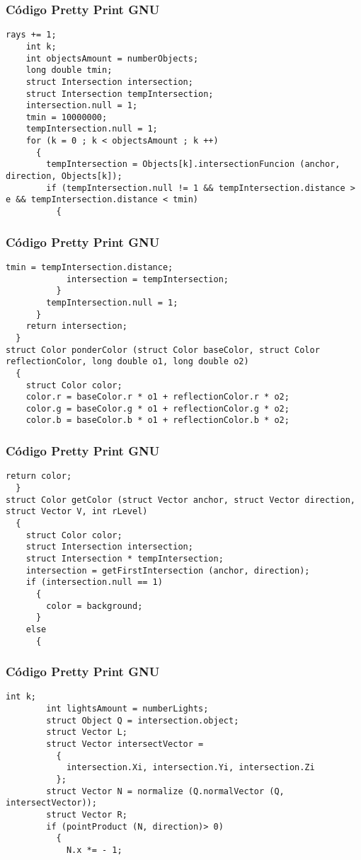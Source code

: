 \documentclass{beamer}
\begin{document}
\begin{frame}[fragile]
\frametitle{C\'odigo Pretty Print GNU}
\begin{lstlisting}[style=CStyle]
    rays += 1;
    int k;
    int objectsAmount = numberObjects;
    long double tmin;
    struct Intersection intersection;
    struct Intersection tempIntersection;
    intersection.null = 1;
    tmin = 10000000;
    tempIntersection.null = 1;
    for (k = 0 ; k < objectsAmount ; k ++)
      {
        tempIntersection = Objects[k].intersectionFuncion (anchor, direction, Objects[k]);
        if (tempIntersection.null != 1 && tempIntersection.distance > e && tempIntersection.distance < tmin)
          {
            \end{lstlisting}
\end{frame}
\begin{frame}[fragile]
\frametitle{C\'odigo Pretty Print GNU}
\begin{lstlisting}[style=CStyle]
            tmin = tempIntersection.distance;
            intersection = tempIntersection;
          }
        tempIntersection.null = 1;
      }
    return intersection;
  }
struct Color ponderColor (struct Color baseColor, struct Color reflectionColor, long double o1, long double o2)
  {
    struct Color color;
    color.r = baseColor.r * o1 + reflectionColor.r * o2;
    color.g = baseColor.g * o1 + reflectionColor.g * o2;
    color.b = baseColor.b * o1 + reflectionColor.b * o2;
\end{lstlisting}
\end{frame}
\begin{frame}[fragile]
\frametitle{C\'odigo Pretty Print GNU}
\begin{lstlisting}[style=CStyle]
    return color;
  }
struct Color getColor (struct Vector anchor, struct Vector direction, struct Vector V, int rLevel)
  {
    struct Color color;
    struct Intersection intersection;
    struct Intersection * tempIntersection;
    intersection = getFirstIntersection (anchor, direction);
    if (intersection.null == 1)
      {
        color = background;
      }
    else
      {
        \end{lstlisting}
\end{frame}
\begin{frame}[fragile]
\frametitle{C\'odigo Pretty Print GNU}
\begin{lstlisting}[style=CStyle]
        int k;
        int lightsAmount = numberLights;
        struct Object Q = intersection.object;
        struct Vector L;
        struct Vector intersectVector =
          {
            intersection.Xi, intersection.Yi, intersection.Zi
          };
        struct Vector N = normalize (Q.normalVector (Q, intersectVector));
        struct Vector R;
        if (pointProduct (N, direction)> 0)
          {
            N.x *= - 1;
\end{lstlisting}
\end{frame}
\end{document}
